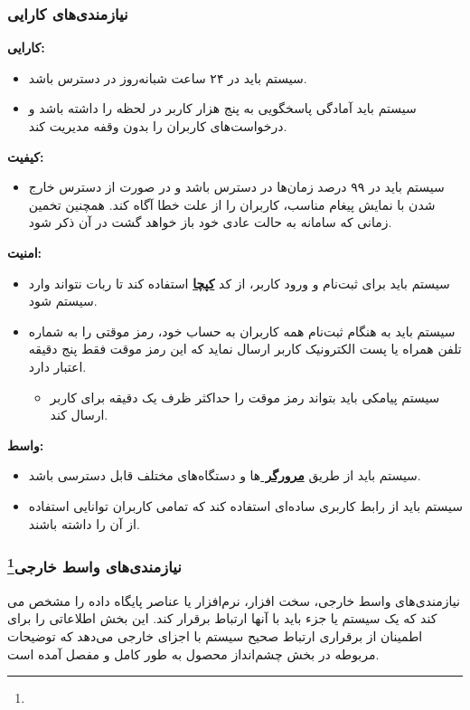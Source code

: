 \documentclass[12pt]{article}
\begin{document}
	\subsubsection{نیازمندی‌های کارایی}

	\textbf{کارایی:}
	\begin{itemize}
		\item
		سیستم باید در ۲۴ ساعت شبانه‌روز در دسترس باشد.
		\item
		سیستم باید آمادگی پاسخگویی به پنج هزار کاربر در لحظه را داشته باشد و درخواست‌های کاربران را بدون وقفه مدیریت کند.
	\end{itemize}

	\textbf{کیفیت:}
	\begin{itemize}
		\item
		سیستم باید در ۹۹ درصد زمان‌ها در دسترس باشد و در صورت از دسترس خارج شدن با نمایش پیغام مناسب، کاربران را از علت خطا آگاه کند. همچنین تخمین زمانی که سامانه به حالت عادی خود باز خواهد گشت در آن ذکر شود.
	\end{itemize}

	\textbf{امنیت:}
	\begin{itemize}
		\item
		سیستم باید برای ثبت‌نام و ورود کاربر، از کد \textbf{\hyperref[ref:captcha]{کپچا}} استفاده کند تا ربات نتواند وارد سیستم شود.
		\item
		سیستم باید به هنگام ثبت‌نام همه کاربران به حساب خود، رمز موقتی را به شماره تلفن همراه یا پست الکترونیک کاربر ارسال نماید که این رمز موقت فقط پنج دقیقه اعتبار دارد.
		\begin{itemize}
			\item
			سیستم پیامکی باید بتواند رمز موقت را حداکثر ظرف یک دقیقه برای کاربر ارسال کند.
		\end{itemize}
	\end{itemize}

	\textbf{واسط:}
	\begin{itemize}
		\item
		سیستم باید از طریق \textbf{\hyperref[ref:browser]{مرورگر }}ها و دستگاه‌های مختلف قابل دسترسی باشد.
		\item
		سیستم باید از رابط کاربری ساده‌ای استفاده کند که تمامی کاربران توانایی استفاده از آن را داشته باشند.
	\end{itemize}

	\subsubsection{نیازمندی‌های واسط خارجی\footnote{}}
	نیازمندی‌های واسط خارجی، سخت افزار، نرم‌افزار یا عناصر پایگاه داده را مشخص می کند که یک سیستم یا جزء باید با آنها ارتباط برقرار کند. این بخش اطلاعاتی را برای اطمینان از برقراری ارتباط صحیح سیستم با اجزای خارجی می‌دهد که توضیحات مربوطه در بخش چشم‌انداز محصول به طور کامل و مفصل آمده است.
\end{document}
